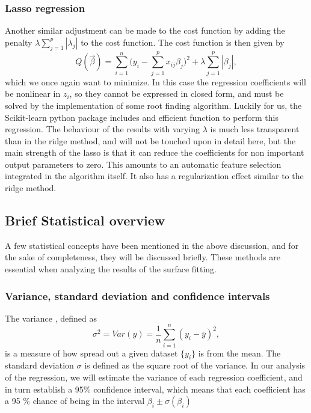 \documentclass{emulateapj}
\begin{document}
\subsubsection{Lasso regression}
Another similar adjustment can be made to the cost function by adding the penalty $\lambda \sum_{j = 1}^p |\lambda_j|$ to the cost function. The cost function is then given by
\begin{equation}
Q(\vec{\beta}) = \sum_{i=1}^{n}\Big(y_i-\sum_{j=1}^px_{ij}\beta_j\Big)^2+\lambda\sum_{j=1}^p|\beta_j|,
\end{equation}
which we once again want to minimize. In this case the regression coefficients will be nonlinear in $z_i$, so they cannot be expressed in closed form, and must be solved by the implementation of some root finding algorithm. Luckily for us, the Scikit-learn python package includes and efficient function to perform this regression. The behaviour of the results with varying $\lambda$ is much less transparent than in the ridge method, and will not be touched upon in detail here,  but the main strength of the lasso is that it can reduce the coefficients for non important output parameters to zero. This amounts to an automatic feature selection integrated in the algorithm itself. It also has a regularization effect similar to the ridge method.  

\subsection{Brief Statistical overview}
A few statistical concepts have been mentioned in the above discussion, and for the sake of completeness, they will be discussed briefly. These methods are essential when analyzing the results of the surface fitting.
\subsubsection{Variance, standard deviation and confidence intervals }

The variance , defined as 
\begin{equation}
\sigma^2 = Var(y)=\frac{1}{n}\sum_{i=1}^n(y_i-\bar{y})^2, 
\end{equation}
is a measure of how spread out a given dataset $\{ y_i \}$ is from the mean. The standard deviation $\sigma$ is defined as the square root of the variance.  In our analysis of the regression, we will estimate the variance of each regression coefficient, and in turn establish a 95\% confidence interval, which means that each coefficient has a 95 \% chance of being in the interval $\beta_i \pm \sigma(\beta_i)$
\end{document}
